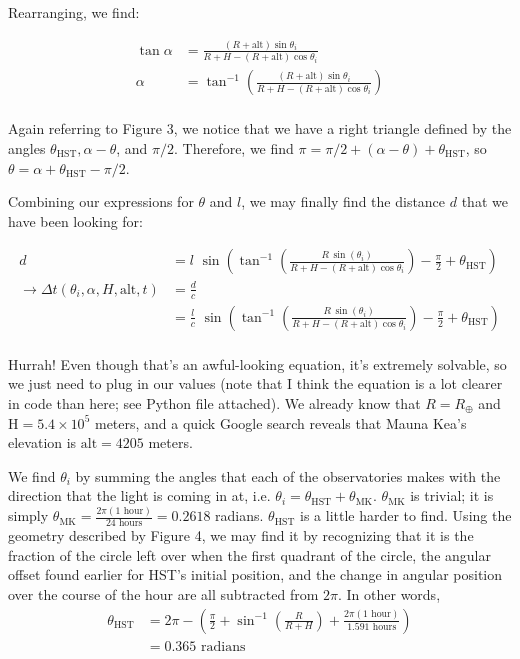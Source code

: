 \documentclass[12pt]{article}
\begin{document}
\begin{onehalfspacing}
Rearranging, we find:

\begin{align*}
  \tan \alpha &= \frac{ (R + \text{alt}) \sin \theta_i}{R + H - (R + \text{alt}) \cos \theta_i} \\
  \alpha &= \tan^{-1} \left( \frac{ (R + \text{alt}) \sin \theta_i}{R + H - (R + \text{alt}) \cos \theta_i} \right) \\
\end{align*}

Again referring to Figure 3, we notice that we have a right triangle defined by the angles $\theta_{\text{HST}}, \alpha - \theta$, and $\pi/2$. Therefore, we find $\pi = \pi/2 + (\alpha - \theta) + \theta_{\text{HST}}$, so $\theta = \alpha + \theta_{\text{HST}} - \pi/2$.


Combining our expressions for $\theta$ and $l$, we may finally find the distance $d$ that we have been looking for:


\begin{align*}
  d &= l \,\, \sin \left( \tan^{-1} \left(   \frac{R \, \sin(\theta_i)}{R + H - (R + \text{alt}) \cos{\theta_i}} \right) - \frac{\pi}{2} + \theta_{\text{HST}} \right) \\
  \rightarrow \Delta t (\theta_i, \alpha, H, \text{alt}, t) &= \frac{d}{c} \\
                       &= \frac{l}{c} \,\, \sin \left( \tan^{-1} \left(   \frac{R \, \sin(\theta_i)}{R + H - (R + \text{alt}) \cos{\theta_i}} \right) - \frac{\pi}{2} + \theta_{\text{HST}} \right) \\
\end{align*}

Hurrah! Even though that's an awful-looking equation, it's extremely solvable, so we just need to plug in our values (note that I think the equation is a lot clearer in code than here; see Python file attached). We already know that $R = R_{\oplus}$ and $\text{H} = 5.4 \times 10^5$ meters, and a quick Google search reveals that Mauna Kea's elevation is $\text{alt}=4205$ meters.

\bigskip
\bigskip

We find $\theta_i$ by summing the angles that each of the observatories makes with the direction that the light is coming in at, i.e. $\theta_i = \theta_{\text{HST}} + \theta_{\text{MK}}$. $\theta_{\text{MK}}$ is trivial; it is simply $\theta_{\text{MK}} = \frac{2 \pi (1 \text{ hour})}{24 \text{ hours}} = 0.2618$ radians. $\theta_{\text{HST}}$ is a little harder to find. Using the geometry described by Figure 4, we may find it by recognizing that it is the fraction of the circle left over when the first quadrant of the circle, the angular offset found  earlier for HST's initial position, and the change in angular position over the course of the hour are all subtracted from $2 \pi$. In other words,
\begin{align*}
  \theta_{\text{HST}} &= 2 \pi - \left(\frac{\pi}{2} + \sin^{-1} \left( \frac{R}{R + H}\right) + \frac{2 \pi (1 \text{ hour})}{1.591 \text{ hours}} \right) \\
                      &= 0.365 \text{ radians} \\
\end{align*}


\end{onehalfspacing}
\end{document}
